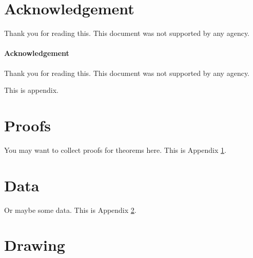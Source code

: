 \documentclass[letterpaper, 11pt]{article}
\begin{document}
\section*{Acknowledgement}
Thank you for reading this. This document was not supported by any agency.


\paragraph{Acknowledgement} 
Thank you for reading this. This document was not supported by any agency.






\newpage
\renewcommand{\appendixpagename}{Appendix}

\appendix
\appendixpage

This is appendix.

\section{Proofs} \label{appendix:proofs}

You may want to collect proofs for theorems here. This is Appendix \ref{appendix:proofs}.

\section{Data} \label{appendix:data}

Or maybe some data. This is Appendix \ref{appendix:data}.

\section{Drawing} \label{appendix:drawing}
\end{document}
